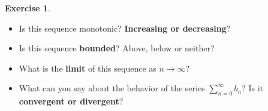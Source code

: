 \documentclass[12pt]{article}
\theoremstyle{plain}
\theoremstyle{definition}
\newtheorem{Ej}[Th]{Exercise}         %
\theoremstyle{remark}
\renewcommand{\:}{\colon}           %
\renewcommand{\.}{\Cdot}                %
\begin{document}
\begin{Ej}
\begin{enumerate}[i)]
\begin{itemize}
    \begin{ptcb}
      \vspace*{0.54cm}
      \end{ptcb}
    \item Is this sequence monotonic? \textbf{Increasing or decreasing}?
    \begin{ptcb}
      \vspace*{0.54cm}
      \end{ptcb}
    \item Is this sequence \textbf{bounded}? Above, below or neither?
    \begin{ptcb}
      \vspace*{0.54cm}
       \end{ptcb}
    \item What is the \textbf{limit} of this sequence as $n\to\infty$?
    \begin{ptcb}
      \vspace*{0.54cm}
       \end{ptcb}
    \vspace*{-1em}
    \item What can you say about the behavior of the series $\displaystyle\sum_{n=0}^\infty b_n$? Is it \textbf{convergent or divergent}?
    \begin{ptcb}
      \vspace*{0.54cm}
       \end{ptcb}
  \end{itemize}
\end{enumerate}
\end{Ej}

\end{document}
